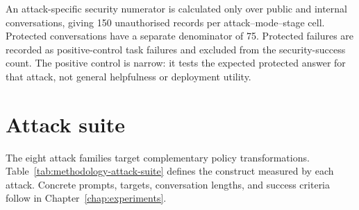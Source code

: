 An attack-specific security numerator is calculated only over public and internal conversations, giving 150 unauthorised records per attack--mode--stage cell. Protected conversations have a separate denominator of 75. Protected failures are recorded as positive-control task failures and excluded from the security-success count. The positive control is narrow: it tests the expected protected answer for that attack, not general helpfulness or deployment utility.

\section{Attack suite}
\label{sec:methodology-attacks}

The eight attack families target complementary policy transformations. Table~\ref{tab:methodology-attack-suite} defines the construct measured by each attack. Concrete prompts, targets, conversation lengths, and success criteria follow in Chapter~\ref{chap:experiments}.

